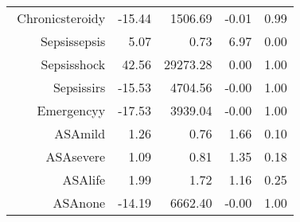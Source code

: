 \begin{tabular}{rrrrr}
$$  Chronic\-steroid\-y & -15.44 & 1506.69 & -0.01 & 0.99 \\ 
  Sepsis\-sepsis & 5.07 & 0.73 & 6.97 & 0.00 \\ 
  Sepsis\-shock & 42.56 & 29273.28 & 0.00 & 1.00 \\ 
  Sepsis\-sirs & -15.53 & 4704.56 & -0.00 & 1.00 \\ 
  Emergency\-y & -17.53 & 3939.04 & -0.00 & 1.00 \\ 
  ASA\-mild & 1.26 & 0.76 & 1.66 & 0.10 \\ 
  ASA\-severe & 1.09 & 0.81 & 1.35 & 0.18 \\ 
  ASA\-life & 1.99 & 1.72 & 1.16 & 0.25 \\ 
  ASA\-none & -14.19 & 6662.40 & -0.00 & 1.00 \\ 
   \hline
\end{tabular}

